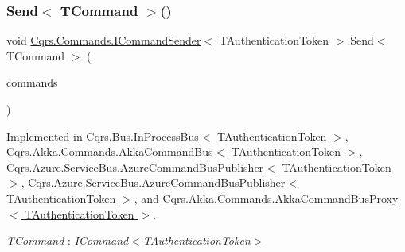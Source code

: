 \subsubsection{\texorpdfstring{Send$<$ T\+Command $>$()}{Send< TCommand >()}\hspace{0.1cm}{\footnotesize\ttfamily [2/2]}}
{\footnotesize\ttfamily void \hyperlink{interfaceCqrs_1_1Commands_1_1ICommandSender}{Cqrs.\+Commands.\+I\+Command\+Sender}$<$ T\+Authentication\+Token $>$.Send$<$ T\+Command $>$ (\begin{DoxyParamCaption}\item[{I\+Enumerable$<$ T\+Command $>$}]{commands }\end{DoxyParamCaption})}



Implemented in \hyperlink{classCqrs_1_1Bus_1_1InProcessBus_ae5dae5f2445387280c974ec181167055}{Cqrs.\+Bus.\+In\+Process\+Bus$<$ T\+Authentication\+Token $>$}, \hyperlink{classCqrs_1_1Akka_1_1Commands_1_1AkkaCommandBus_a06b7b148493c67d79aaf6b7d59afa487}{Cqrs.\+Akka.\+Commands.\+Akka\+Command\+Bus$<$ T\+Authentication\+Token $>$}, \hyperlink{classCqrs_1_1Azure_1_1ServiceBus_1_1AzureCommandBusPublisher_a1f6742c31a81a1bc96962acd28d4e8d2}{Cqrs.\+Azure.\+Service\+Bus.\+Azure\+Command\+Bus\+Publisher$<$ T\+Authentication\+Token $>$}, \hyperlink{classCqrs_1_1Azure_1_1ServiceBus_1_1AzureCommandBusPublisher_a1f6742c31a81a1bc96962acd28d4e8d2}{Cqrs.\+Azure.\+Service\+Bus.\+Azure\+Command\+Bus\+Publisher$<$ T\+Authentication\+Token $>$}, and \hyperlink{classCqrs_1_1Akka_1_1Commands_1_1AkkaCommandBusProxy_a30115e2f8c964967aa8fe94712ece7c2}{Cqrs.\+Akka.\+Commands.\+Akka\+Command\+Bus\+Proxy$<$ T\+Authentication\+Token $>$}.

\begin{Desc}
\item[Type Constraints]\begin{description}
\item[{\em T\+Command} : {\em I\+Command$<$T\+Authentication\+Token$>$}]\end{description}
\end{Desc}
